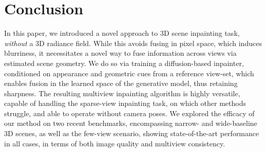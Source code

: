 \section{Conclusion}

In this paper, we introduced a novel approach to 3D scene inpainting task, \textit{without}
a 3D radiance field.
While this avoids fusing in pixel space, which induces blurriness, it necessitates a novel way to fuse information across views via estimated scene geometry.
We do so via training a diffusion-based inpainter, conditioned on appearance and geometric cues from a reference view-set, which enables fusion in the learned space of the generative model, thus retaining sharpness.
The resulting multiview inpainting algorithm is highly versatile, 
capable of handling the sparse-view inpainting task, on which other methods struggle, and able to operate without camera poses.
We explored the efficacy of our method on two recent benchmarks, encompassing narrow- and wide-baseline 3D scenes, as well as the few-view scenario, showing state-of-the-art performance in all cases, in terms of both image quality and multiview consistency.





